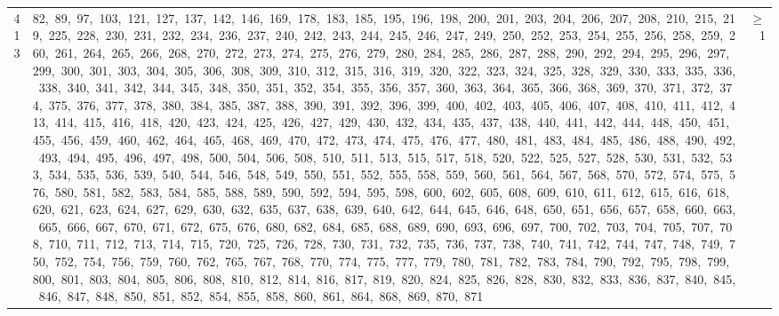 \begin{longtable}{c|p{}|r}
413 & 82,\ 89,\ 97,\ 103,\ 121,\ 127,\ 137,\ 142,\ 146,\ 169,\ 178,\ 183,\ 185,\ 195,\ 196,\ 198,\ 200,\ 201,\ 203,\ 204,\ 206,\ 207,\ 208,\ 210,\ 215,\ 219,\ 225,\ 228,\ 230,\ 231,\ 232,\ 234,\ 236,\ 237,\ 240,\ 242,\ 243,\ 244,\ 245,\ 246,\ 247,\ 249,\ 250,\ 252,\ 253,\ 254,\ 255,\ 256,\ 258,\ 259,\ 260,\ 261,\ 264,\ 265,\ 266,\ 268,\ 270,\ 272,\ 273,\ 274,\ 275,\ 276,\ 279,\ 280,\ 284,\ 285,\ 286,\ 287,\ 288,\ 290,\ 292,\ 294,\ 295,\ 296,\ 297,\ 299,\ 300,\ 301,\ 303,\ 304,\ 305,\ 306,\ 308,\ 309,\ 310,\ 312,\ 315,\ 316,\ 319,\ 320,\ 322,\ 323,\ 324,\ 325,\ 328,\ 329,\ 330,\ 333,\ 335,\ 336,\ 338,\ 340,\ 341,\ 342,\ 344,\ 345,\ 348,\ 350,\ 351,\ 352,\ 354,\ 355,\ 356,\ 357,\ 360,\ 363,\ 364,\ 365,\ 366,\ 368,\ 369,\ 370,\ 371,\ 372,\ 374,\ 375,\ 376,\ 377,\ 378,\ 380,\ 384,\ 385,\ 387,\ 388,\ 390,\ 391,\ 392,\ 396,\ 399,\ 400,\ 402,\ 403,\ 405,\ 406,\ 407,\ 408,\ 410,\ 411,\ 412,\ 413,\ 414,\ 415,\ 416,\ 418,\ 420,\ 423,\ 424,\ 425,\ 426,\ 427,\ 429,\ 430,\ 432,\ 434,\ 435,\ 437,\ 438,\ 440,\ 441,\ 442,\ 444,\ 448,\ 450,\ 451,\ 455,\ 456,\ 459,\ 460,\ 462,\ 464,\ 465,\ 468,\ 469,\ 470,\ 472,\ 473,\ 474,\ 475,\ 476,\ 477,\ 480,\ 481,\ 483,\ 484,\ 485,\ 486,\ 488,\ 490,\ 492,\ 493,\ 494,\ 495,\ 496,\ 497,\ 498,\ 500,\ 504,\ 506,\ 508,\ 510,\ 511,\ 513,\ 515,\ 517,\ 518,\ 520,\ 522,\ 525,\ 527,\ 528,\ 530,\ 531,\ 532,\ 533,\ 534,\ 535,\ 536,\ 539,\ 540,\ 544,\ 546,\ 548,\ 549,\ 550,\ 551,\ 552,\ 555,\ 558,\ 559,\ 560,\ 561,\ 564,\ 567,\ 568,\ 570,\ 572,\ 574,\ 575,\ 576,\ 580,\ 581,\ 582,\ 583,\ 584,\ 585,\ 588,\ 589,\ 590,\ 592,\ 594,\ 595,\ 598,\ 600,\ 602,\ 605,\ 608,\ 609,\ 610,\ 611,\ 612,\ 615,\ 616,\ 618,\ 620,\ 621,\ 623,\ 624,\ 627,\ 629,\ 630,\ 632,\ 635,\ 637,\ 638,\ 639,\ 640,\ 642,\ 644,\ 645,\ 646,\ 648,\ 650,\ 651,\ 656,\ 657,\ 658,\ 660,\ 663,\ 665,\ 666,\ 667,\ 670,\ 671,\ 672,\ 675,\ 676,\ 680,\ 682,\ 684,\ 685,\ 688,\ 689,\ 690,\ 693,\ 696,\ 697,\ 700,\ 702,\ 703,\ 704,\ 705,\ 707,\ 708,\ 710,\ 711,\ 712,\ 713,\ 714,\ 715,\ 720,\ 725,\ 726,\ 728,\ 730,\ 731,\ 732,\ 735,\ 736,\ 737,\ 738,\ 740,\ 741,\ 742,\ 744,\ 747,\ 748,\ 749,\ 750,\ 752,\ 754,\ 756,\ 759,\ 760,\ 762,\ 765,\ 767,\ 768,\ 770,\ 774,\ 775,\ 777,\ 779,\ 780,\ 781,\ 782,\ 783,\ 784,\ 790,\ 792,\ 795,\ 798,\ 799,\ 800,\ 801,\ 803,\ 804,\ 805,\ 806,\ 808,\ 810,\ 812,\ 814,\ 816,\ 817,\ 819,\ 820,\ 824,\ 825,\ 826,\ 828,\ 830,\ 832,\ 833,\ 836,\ 837,\ 840,\ 845,\ 846,\ 847,\ 848,\ 850,\ 851,\ 852,\ 854,\ 855,\ 858,\ 860,\ 861,\ 864,\ 868,\ 869,\ 870,\ 871 & $\ge$ 1 \\

\end{longtable}
